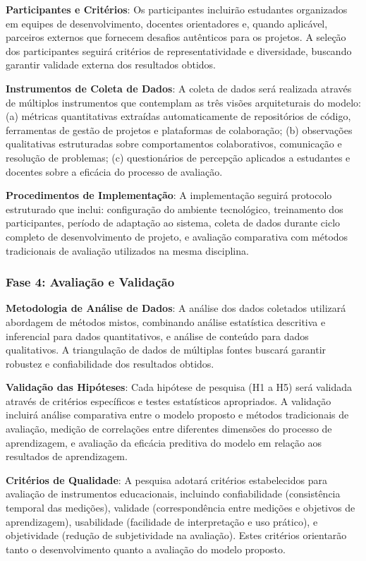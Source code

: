 \documentclass[12pt, a4paper, oneside, brazilian]{abntex2}
\begin{document}
\textbf{Participantes e Critérios}: Os participantes incluirão estudantes organizados em equipes de desenvolvimento, docentes orientadores e, quando aplicável, parceiros externos que fornecem desafios autênticos para os projetos. A seleção dos participantes seguirá critérios de representatividade e diversidade, buscando garantir validade externa dos resultados obtidos.

\textbf{Instrumentos de Coleta de Dados}: A coleta de dados será realizada através de múltiplos instrumentos que contemplam as três visões arquiteturais do modelo: (a) métricas quantitativas extraídas automaticamente de repositórios de código, ferramentas de gestão de projetos e plataformas de colaboração; (b) observações qualitativas estruturadas sobre comportamentos colaborativos, comunicação e resolução de problemas; (c) questionários de percepção aplicados a estudantes e docentes sobre a eficácia do processo de avaliação.

\textbf{Procedimentos de Implementação}: A implementação seguirá protocolo estruturado que inclui: configuração do ambiente tecnológico, treinamento dos participantes, período de adaptação ao sistema, coleta de dados durante ciclo completo de desenvolvimento de projeto, e avaliação comparativa com métodos tradicionais de avaliação utilizados na mesma disciplina.

\subsubsection{Fase 4: Avaliação e Validação}

\textbf{Metodologia de Análise de Dados}: A análise dos dados coletados utilizará abordagem de métodos mistos, combinando análise estatística descritiva e inferencial para dados quantitativos, e análise de conteúdo para dados qualitativos. A triangulação de dados de múltiplas fontes buscará garantir robustez e confiabilidade dos resultados obtidos.

\textbf{Validação das Hipóteses}: Cada hipótese de pesquisa (H1 a H5) será validada através de critérios específicos e testes estatísticos apropriados. A validação incluirá análise comparativa entre o modelo proposto e métodos tradicionais de avaliação, medição de correlações entre diferentes dimensões do processo de aprendizagem, e avaliação da eficácia preditiva do modelo em relação aos resultados de aprendizagem.

\textbf{Critérios de Qualidade}: A pesquisa adotará critérios estabelecidos para avaliação de instrumentos educacionais, incluindo confiabilidade (consistência temporal das medições), validade (correspondência entre medições e objetivos de aprendizagem), usabilidade (facilidade de interpretação e uso prático), e objetividade (redução de subjetividade na avaliação). Estes critérios orientarão tanto o desenvolvimento quanto a avaliação do modelo proposto.
\end{document}

